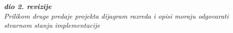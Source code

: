 			\textbf{\textit{dio 2. revizije}}\\			
			
			\textit{Prilikom druge predaje projekta dijagram razreda i opisi moraju odgovarati stvarnom stanju implementacije}
			
			
			
			\eject
		
			
			
			
			
		
			
			
		
		

